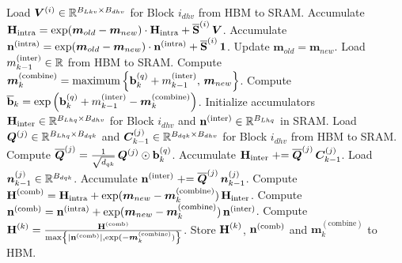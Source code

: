 \documentclass{article}
\newcommand{\minter}{{m}^{(\text{inter})}}
\newcommand{\mcombine}{\bm{m}^{(\text{combine})}}
\newcommand{\Hinter}{\bm{\rH}_{\text{inter}}}
\newcommand{\Hintra}{\bm{\rH}_{\text{intra}}}
\newcommand{\shapeone}[1]{\in \dR^{#1}}
\newcommand{\shapetwo}[2]{\in \dR^{#1 \times #2}}
\begin{document}
\begin{algorithm}
\begin{algorithmic}[1]
            \State Load $\BV^{(i)} \shapetwo{B_{Lkv}}{B_{dhv}}$ for Block $i_{dhv}$ from HBM to SRAM.
            \State Accumulate $\Hintra = \exp (\bm m_{old} - \bm m_{new}) \cdot \Hintra + \overline{\bm \rS}^{(i)} \, \BV$.
            \State Accumulate $\bm{\mathrm{n}}^{(\text{intra})} = \exp (\bm m_{old} - \bm m_{new}) \cdot \bm{\mathrm{n}}^{(\text{intra})} + \overline{\bm {\mathrm{S}}}^{(i)} \, \bm 1$.
            \State Update $\bm m_{old} = \bm m_{new}$.
            \EndFor \newline
            \State Load $\minter_{k-1} \in \dR$ from HBM to SRAM.
            \State Compute $\mcombine_k = \mathrm{maximum} \left\{ \bm \Rb_k^{(q)} + \minter_{k-1}, \, \bm m_{new} \right\}$.
            \State Compute $\overline{\bm{\Rb}}_k = \exp \left( \bm \Rb_k^{(q)} + \minter_{k-1} - \mcombine_k \right)$.
            \State Initialize accumulators $\Hinter \shapetwo{B_{Lhq}}{B_{dhv}}$ for Block $i_{dhv}$ and $\ninter \shapeone{B_{Lhq}}$ in SRAM. \newline
            \State Load $\BQ^{(j)} \shapetwo{B_{Lhq}}{B_{dqk}}$ and $\BC_{k-1}^{(j)} \shapetwo{B_{dqk}}{B_{dhv}}$ for Block $i_{dhv}$ from HBM to SRAM.
            \State Compute $\overline{\bm{Q}}^{(j)} = \frac{1}{\sqrt{d_{qk}}} \, \bm{Q}^{(j)} \odot \bm {\mathrm{b}}_k^{(q)}$.
            \State Accumulate $\Hinter \mathrel{+}= \overline{\BQ}^{(j)} \, \BC_{k-1}^{(j)}$.
            \State Load $\bm \Bn_{k-1}^{(j)} \shapeone{B_{dqk}}$.
            \State Accumulate $\bm{\mathrm{n}}^{(\text{inter})} \mathrel{+}= \overline{\bm{Q}}^{(j)} \,\bm {\bm{n}}_{k-1}^{(j)}$.
            \EndFor
            \State Compute $\Hcomb = \Hintra + \exp (\bm m_{new} - \mcombine_k) \, \Hinter$.
            \State Compute $\ncomb = \nintra + \exp (\bm m_{new} - \mcombine_k) \, \ninter$.
            \State Compute $\bm \rH^{(k)} = \frac{\Hcomb}{\max \left\{|\ncomb|, \exp(-\mcombine_k)\right\}}$.
            \State Store $\bm {\mathrm{H}}^{(k)}$, $\bm{\mathrm{n}}^{(\text{comb})}$ and $\mcombine_k$ to HBM.
        \end{algorithmic}
    \end{algorithm}

\newpage
    
\end{document}
